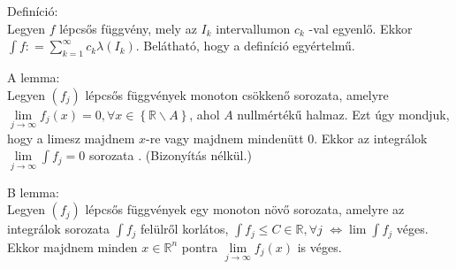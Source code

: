 \documentclass[12pt,a4paper]{scrartcl}
\newenvironment{definicio}{}{}
\newenvironment{tetel}{}{}
\begin{document}
\begin{definicio}

Definíció:\\
Legyen \(f\) lépcsős függvény, mely az \(I_{k}\) intervallumon \(c_{k}\)
-val egyenlő. Ekkor
\({\int f}: = {\sum\limits_{k = 1}^{\infty}{c_{k}\lambda\left( I_{k} \right)}}\).
Belátható, hogy a definíció egyértelmű.

\end{definicio}

\begin{tetel}

A lemma:\\
Legyen \(\left( f_{j} \right)\) lépcsős függvények monoton csökkenő
sorozata, amelyre
\(\lim\limits_{j\rightarrow\infty}f_{j}\left( x \right) = 0,\forall x \in \left\{ {{\mathbb{R}}\backslash A} \right\}\),
ahol \(A\) nullmértékű halmaz. Ezt úgy mondjuk, hogy a limesz majdnem
\(x\)-re vagy majdnem mindenütt 0. Ekkor az integrálok
\(\lim\limits_{j\rightarrow\infty}{\int f_{j}} = 0\) sorozata .
(Bizonyítás nélkül.)

\end{tetel}

\begin{tetel}

B lemma:\\
Legyen \(\left( f_{j} \right)\) lépcsős függvények egy monoton növő
sorozata, amelyre az integrálok sorozata \(\int f_{j}\) felülről
korlátos, \({\int f_{j}} \leq C \in {\mathbb{R}},\forall j\)
\(\left. \Leftrightarrow\lim{\int f_{j}} \right.\) véges. Ekkor majdnem
minden \(x \in {\mathbb{R}}^{n}\) pontra
\(\lim\limits_{j\rightarrow\infty}f_{j}\left( x \right)\) is véges.

\end{tetel}
\end{document}

